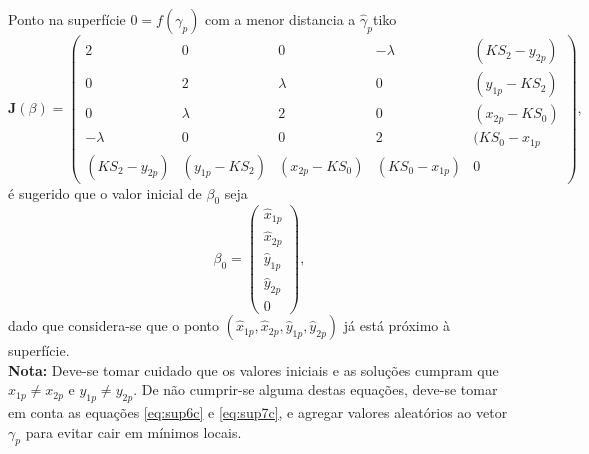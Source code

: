 \documentclass[a4paper,10pt]{article}
\begin{document}
\begin{corollarytcolorbox}{Ponto na superfície $0=f(\gamma_p)$ com a menor distancia a $\hat{\gamma}_p$}{tiko}
\begin{equation}\label{eq:t4}
 \mathbf{J}(\beta)=\left(
 \begin{matrix}
  2&0&0&-\lambda&(K S_2 - y_{2p})\\
  0&2&\lambda&0&(y_{1p}-K S_2)\\
  0&\lambda&2&0&(x_{2p}-K S_0)\\
  -\lambda&0&0&2&(K S_0 -x_{1p}\\
  (K S_2 - y_{2p})&(y_{1p}-K S_2)&(x_{2p}-K S_0)&(K S_0-x_{1p})&0
 \end{matrix}
 \right),
\end{equation}
é sugerido que o valor inicial de $\beta_0$  seja 
\begin{equation}\label{eq:t2}
 \beta_{0}=\left(
 \begin{matrix}
 \hat{x}_{1p}\\
 \hat{x}_{2p}\\
 \hat{y}_{1p}\\
 \hat{y}_{2p}\\
 0
 \end{matrix}
 \right),
 \end{equation}
 dado que considera-se que o ponto $(\hat{x}_{1p}, \hat{x}_{2p}, \hat{y}_{1p}, \hat{y}_{2p})$
 já está próximo à superfície. \\
 
 \textbf{Nota:} Deve-se tomar cuidado que os valores iniciais e as soluções
 cumpram que $x_{1p} \neq x_{2p}$ e $y_{1p} \neq y_{2p}$. De não cumprir-se alguma destas equações,
 deve-se tomar em conta as equações \eqref{eq:sup6c} e \eqref{eq:sup7c}, e agregar valores aleatórios ao vetor $\gamma_p$ para evitar cair em mínimos locais.
\end{corollarytcolorbox}
\end{document}
